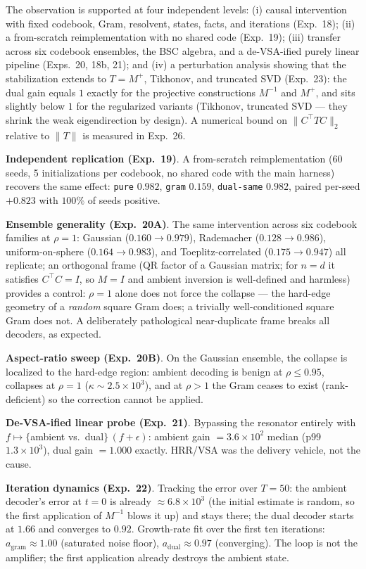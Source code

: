 \documentclass[11pt,a4paper]{article}
\begin{document}
The observation is supported at four independent levels: (i) causal intervention with fixed codebook, Gram, resolvent, states, facts, and iterations (Exp.~18); (ii) a from-scratch reimplementation with no shared code (Exp.~19); (iii) transfer across six codebook ensembles, the BSC algebra, and a de-VSA-ified purely linear pipeline (Exps.~20, 18b, 21); and (iv) a perturbation analysis showing that the stabilization extends to $T = M^{+}$, Tikhonov, and truncated SVD (Exp.~23): the dual gain equals $1$ exactly for the projective constructions $M^{-1}$ and $M^{+}$, and sits slightly below $1$ for the regularized variants (Tikhonov, truncated SVD --- they shrink the weak eigendirection by design). A numerical bound on $\|C^{\top} T C\|_2$ relative to $\|T\|$ is measured in Exp.~26.

\textbf{Independent replication (Exp.~19)}. A from-scratch reimplementation (60 seeds, 5 initializations per codebook, no shared code with the main harness) recovers the same effect: \texttt{pure} $0.982$, \texttt{gram} $0.159$, \texttt{dual-same} $0.982$, paired per-seed $+0.823$ with $100\%$ of seeds positive.

\textbf{Ensemble generality (Exp.~20A)}. The same intervention across six codebook families at $\rho=1$: Gaussian ($0.160 \to 0.979$), Rademacher ($0.128 \to 0.986$), uniform-on-sphere ($0.164 \to 0.983$), and Toeplitz-correlated ($0.175 \to 0.947$) all replicate; an orthogonal frame (QR factor of a Gaussian matrix; for $n=d$ it satisfies $C^{\top}C=I$, so $M=I$ and ambient inversion is well-defined and harmless) provides a control: $\rho=1$ alone does not force the collapse --- the hard-edge geometry of a \emph{random} square Gram does; a trivially well-conditioned square Gram does not. A deliberately pathological near-duplicate frame breaks all decoders, as expected.

\textbf{Aspect-ratio sweep (Exp.~20B)}. On the Gaussian ensemble, the collapse is localized to the hard-edge region: ambient decoding is benign at $\rho \le 0.95$, collapses at $\rho = 1$ ($\kappa \sim 2.5\times 10^{3}$), and at $\rho > 1$ the Gram ceases to exist (rank-deficient) so the correction cannot be applied.

\textbf{De-VSA-ified linear probe (Exp.~21)}. Bypassing the resonator entirely with $f \mapsto \{$ambient vs.\ dual$\}\,(f+\epsilon)$: ambient gain $= 3.6\times 10^{2}$ median (p99 $1.3\times 10^{3}$), dual gain $= 1.000$ exactly. HRR/VSA was the delivery vehicle, not the cause.

\textbf{Iteration dynamics (Exp.~22)}. Tracking the error over $T=50$: the ambient decoder's error at $t=0$ is already $\approx 6.8\times 10^{3}$ (the initial estimate is random, so the first application of $M^{-1}$ blows it up) and stays there; the dual decoder starts at $1.66$ and converges to $0.92$. Growth-rate fit over the first ten iterations: $a_{\text{gram}} \approx 1.00$ (saturated noise floor), $a_{\text{dual}} \approx 0.97$ (converging). The loop is not the amplifier; the first application already destroys the ambient state.
\end{document}
